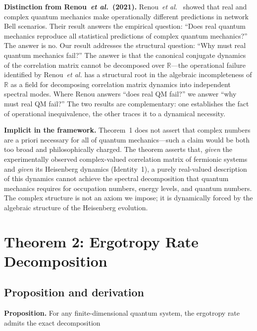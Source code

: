 \documentclass[aps,pra,preprint,groupedaddress,amsmath,amssymb,floatfix]{revtex4-2}
\begin{document}
\textbf{Distinction from Renou~\textit{et al.}~(2021).} Renou~\textit{et al.}~\cite{renou2021} showed that real and complex quantum mechanics make operationally different predictions in network Bell scenarios. Their result answers the empirical question: ``Does real quantum mechanics reproduce all statistical predictions of complex quantum mechanics?'' The answer is no. Our result addresses the structural question: ``Why must real quantum mechanics fail?'' The answer is that the canonical conjugate dynamics of the correlation matrix cannot be decomposed over $\mathbb{R}$---the operational failure identified by Renou~\textit{et al.} has a structural root in the algebraic incompleteness of $\mathbb{R}$ as a field for decomposing correlation matrix dynamics into independent spectral modes. Where Renou answers ``does real QM fail?'' we answer ``why must real QM fail?'' The two results are complementary: one establishes the fact of operational inequivalence, the other traces it to a dynamical necessity.

\textbf{Implicit in the framework.} Theorem~1 does not assert that complex numbers are a priori necessary for all of quantum mechanics---such a claim would be both too broad and philosophically charged. The theorem asserts that, \textit{given} the experimentally observed complex-valued correlation matrix of fermionic systems and \textit{given} its Heisenberg dynamics (Identity~1), a purely real-valued description of this dynamics cannot achieve the spectral decomposition that quantum mechanics requires for occupation numbers, energy levels, and quantum numbers. The complex structure is not an axiom we impose; it is dynamically forced by the algebraic structure of the Heisenberg evolution.

\section{Theorem 2: Ergotropy Rate Decomposition}
\label{sec:theorem2}

\subsection{Proposition and derivation}
\label{sec:th2_derivation}

\textbf{Proposition.} For any finite-dimensional quantum system, the ergotropy rate admits the exact decomposition
\end{document}
